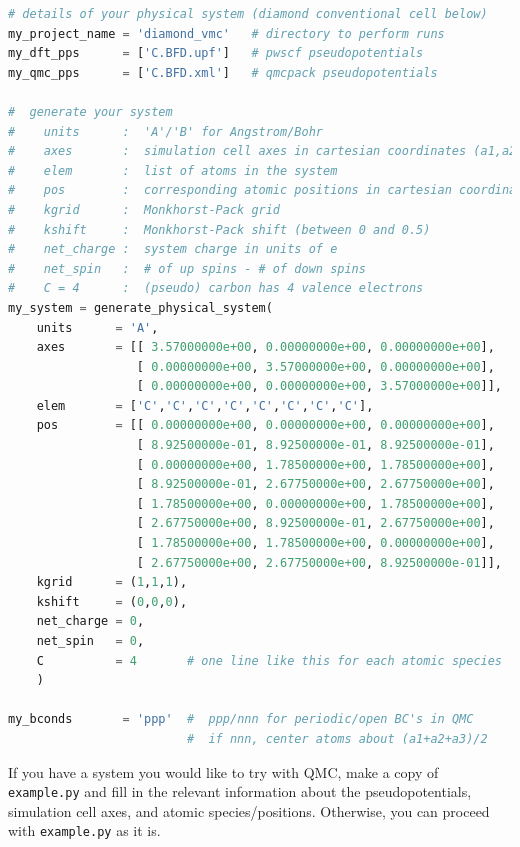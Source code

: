 \begin{lstlisting}[language=Python]
# details of your physical system (diamond conventional cell below)
my_project_name = 'diamond_vmc'   # directory to perform runs
my_dft_pps      = ['C.BFD.upf']   # pwscf pseudopotentials
my_qmc_pps      = ['C.BFD.xml']   # qmcpack pseudopotentials

#  generate your system
#    units      :  'A'/'B' for Angstrom/Bohr
#    axes       :  simulation cell axes in cartesian coordinates (a1,a2,a3)
#    elem       :  list of atoms in the system
#    pos        :  corresponding atomic positions in cartesian coordinates
#    kgrid      :  Monkhorst-Pack grid
#    kshift     :  Monkhorst-Pack shift (between 0 and 0.5)
#    net_charge :  system charge in units of e
#    net_spin   :  # of up spins - # of down spins
#    C = 4      :  (pseudo) carbon has 4 valence electrons
my_system = generate_physical_system(
    units      = 'A',
    axes       = [[ 3.57000000e+00, 0.00000000e+00, 0.00000000e+00],
                  [ 0.00000000e+00, 3.57000000e+00, 0.00000000e+00],
                  [ 0.00000000e+00, 0.00000000e+00, 3.57000000e+00]],
    elem       = ['C','C','C','C','C','C','C','C'],
    pos        = [[ 0.00000000e+00, 0.00000000e+00, 0.00000000e+00],
                  [ 8.92500000e-01, 8.92500000e-01, 8.92500000e-01],
                  [ 0.00000000e+00, 1.78500000e+00, 1.78500000e+00],
                  [ 8.92500000e-01, 2.67750000e+00, 2.67750000e+00],
                  [ 1.78500000e+00, 0.00000000e+00, 1.78500000e+00],
                  [ 2.67750000e+00, 8.92500000e-01, 2.67750000e+00],
                  [ 1.78500000e+00, 1.78500000e+00, 0.00000000e+00],
                  [ 2.67750000e+00, 2.67750000e+00, 8.92500000e-01]],
    kgrid      = (1,1,1),
    kshift     = (0,0,0),
    net_charge = 0,
    net_spin   = 0,
    C          = 4       # one line like this for each atomic species
    )

my_bconds       = 'ppp'  #  ppp/nnn for periodic/open BC's in QMC
                         #  if nnn, center atoms about (a1+a2+a3)/2
\end{lstlisting}

If you have a system you would like to try with QMC, make a copy of \texttt{example.py} and fill in the relevant information about the pseudopotentials, simulation cell axes, and atomic species/positions.  Otherwise, you can proceed with \texttt{example.py} as it is.


